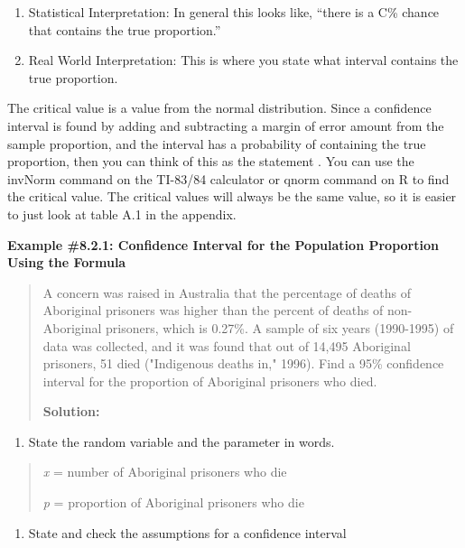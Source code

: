 \documentclass[]{book}
\providecommand{\tightlist}{%
  \setlength{\itemsep}{0pt}\setlength{\parskip}{0pt}}
\begin{document}
\begin{enumerate}
\def\labelenumi{\arabic{enumi}.}
\setcounter{enumi}{3}
\item
  Statistical Interpretation: In general this looks like, ``there is a
  C\% chance that contains the true proportion.''
\item
  Real World Interpretation: This is where you state what interval
  contains the true proportion.
\end{enumerate}

The critical value is a value from the normal distribution. Since a
confidence interval is found by adding and subtracting a margin of error
amount from the sample proportion, and the interval has a probability of
containing the true proportion, then you can think of this as the
statement . You can use the invNorm command on the TI-83/84 calculator
or qnorm command on R to find the critical value. The critical values
will always be the same value, so it is easier to just look at table A.1
in the appendix.

\textbf{Example \#8.2.1: Confidence Interval for the Population Proportion
Using the Formula}

\begin{quote}
A concern was raised in Australia that the percentage of deaths of
Aboriginal prisoners was higher than the percent of deaths of
non-Aboriginal prisoners, which is 0.27\%. A sample of six years
(1990-1995) of data was collected, and it was found that out of 14,495
Aboriginal prisoners, 51 died ("Indigenous deaths in," 1996). Find a
95\% confidence interval for the proportion of Aboriginal prisoners who
died.

\textbf{Solution:}
\end{quote}

\begin{enumerate}
\def\labelenumi{\arabic{enumi}.}
\tightlist
\item
  State the random variable and the parameter in words.
\end{enumerate}

\begin{quote}
\emph{x} = number of Aboriginal prisoners who die

\emph{p} = proportion of Aboriginal prisoners who die
\end{quote}

\begin{enumerate}
\def\labelenumi{\arabic{enumi}.}
\setcounter{enumi}{1}
\tightlist
\item
  State and check the assumptions for a confidence interval
\end{enumerate}
\end{document}
